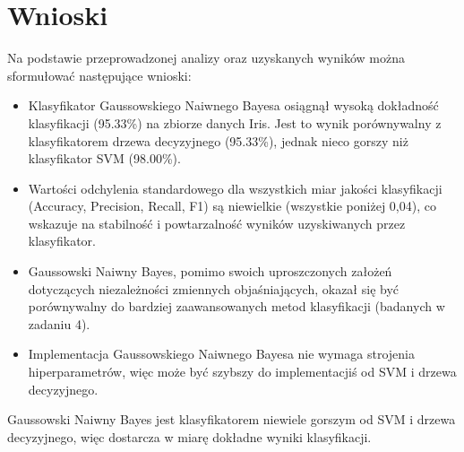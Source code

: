 \documentclass{article}
\begin{document}
\section{Wnioski}

Na podstawie przeprowadzonej analizy oraz uzyskanych wyników można sformułować następujące wnioski:

\begin{itemize}
    \item Klasyfikator Gaussowskiego Naiwnego Bayesa osiągnął wysoką dokładność klasyfikacji (95.33\%) na zbiorze danych Iris. 
    Jest to wynik porównywalny z klasyfikatorem drzewa decyzyjnego (95.33\%), jednak nieco gorszy niż klasyfikator SVM (98.00\%).
    
    \item Wartości odchylenia standardowego dla wszystkich miar jakości klasyfikacji (Accuracy, Precision, Recall, F1) są niewielkie (wszystkie poniżej 0,04),
    co wskazuje na stabilność i powtarzalność wyników uzyskiwanych przez klasyfikator.
    
    \item Gaussowski Naiwny Bayes, pomimo swoich uproszczonych założeń dotyczących niezależności zmiennych objaśniających, 
    okazał się być porównywalny do bardziej zaawansowanych metod klasyfikacji (badanych w zadaniu 4).
    
    \item Implementacja Gaussowskiego Naiwnego Bayesa nie wymaga strojenia hiperparametrów, więc może być szybszy do implementacjiś od SVM i drzewa decyzyjnego.
\end{itemize}

Gaussowski Naiwny Bayes jest klasyfikatorem niewiele gorszym od SVM i drzewa decyzyjnego, więc dostarcza w miarę dokładne wyniki klasyfikacji. 
\end{document}

